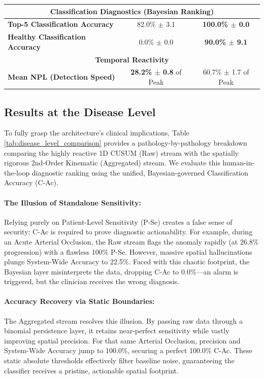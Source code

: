 \documentclass[sigconf]{acmart}
\begin{document}
\begin{table}[ht]
{\begin{tabular}{|l||c|c|}
    \multicolumn{3}{|c|}{\textbf{Classification Diagnostics (Bayesian Ranking)}} \\
    \hline
    \textbf{Top-5 Classification Accuracy} & 82.0\% $\pm$ 3.1 & \textbf{100.0\% $\pm$ 0.0} \\
    \hline
    \textbf{Healthy Classification Accuracy} & 0.0\% $\pm$ 0.0 & \textbf{90.0\% $\pm$ 9.1} \\
    \hline
    \hline

    \multicolumn{3}{|c|}{\textbf{Temporal Reactivity}} \\
    \hline
    \textbf{Mean NPL (Detection Speed)} & \textbf{28.2\% $\pm$ 0.8} of Peak & 60.7\% $\pm$ 1.7 of Peak \\
    \hline
\end{tabular}
}
\end{table}

\subsection{Results at the Disease Level} 
To fully grasp the architecture's clinical implications, Table \ref{tab:disease_level_comparison} provides a pathology-by-pathology breakdown comparing the highly reactive 1D CUSUM (Raw) stream with the spatially rigorous 2nd-Order Kinematic (Aggregated) stream. We evaluate this human-in-the-loop diagnostic ranking using the unified, Bayesian-governed Classification Accuracy (C-Ac).

\paragraph{The Illusion of Standalone Sensitivity:}
Relying purely on Patient-Level Sensitivity (P-Se) creates a false sense of security; C-Ac is required to prove diagnostic actionability. For example, during an Acute Arterial Occlusion, the Raw stream flags the anomaly rapidly (at 26.8\% progression) with a flawless 100\% P-Se. However, massive spatial hallucinations plunge System-Wide Accuracy to 22.5\%. Faced with this chaotic footprint, the Bayesian layer misinterprets the data, dropping C-Ac to 0.0\%---an alarm is triggered, but the clinician receives the wrong diagnosis.

\paragraph{Accuracy Recovery via Static Boundaries:}
The Aggregated stream resolves this illusion. By passing raw data through a binomial persistence layer, it retains near-perfect sensitivity while vastly improving spatial precision. For that same Arterial Occlusion, precision and System-Wide Accuracy jump to 100.0\%, securing a perfect 100.0\% C-Ac. These static absolute thresholds effectively filter baseline noise, guaranteeing the classifier receives a pristine, actionable spatial footprint.
\end{document}
